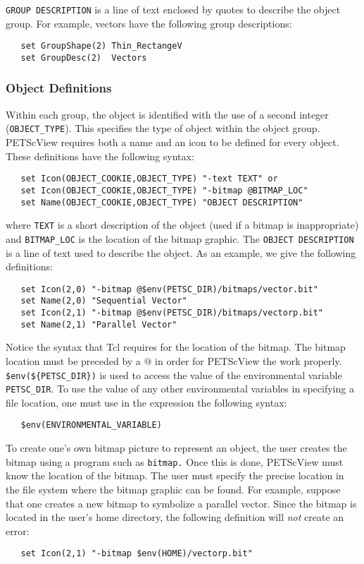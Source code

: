 {{\tt GROUP DESCRIPTION} is a line of text enclosed by quotes to describe the object group.  For example, vectors have the following group descriptions:
\begin{verbatim}
   set GroupShape(2) Thin_RectangeV 
   set GroupDesc(2)  Vectors
\end{verbatim}

\subsubsection{Object Definitions}

Within each group, the object is identified with the use of a second integer ({\tt OBJECT\_TYPE}).  This specifies the type of object within the object group.  PETScView requires both a name and an icon to be defined for every object.  These definitions have the following syntax:
\begin{verbatim}
   set Icon(OBJECT_COOKIE,OBJECT_TYPE) "-text TEXT" or 
   set Icon(OBJECT_COOKIE,OBJECT_TYPE) "-bitmap @BITMAP_LOC"
   set Name(OBJECT_COOKIE,OBJECT_TYPE) "OBJECT DESCRIPTION"
\end{verbatim}
where {\tt TEXT} is a short description of the object (used if a bitmap is inappropriate) and {\tt BITMAP\_LOC} is the location of the bitmap graphic.  The {\tt OBJECT DESCRIPTION} is a line of text used to describe the object.  As an example, we give the following definitions:
\begin{verbatim}
   set Icon(2,0) "-bitmap @$env(PETSC_DIR)/bitmaps/vector.bit" 
   set Name(2,0) "Sequential Vector" 
   set Icon(2,1) "-bitmap @$env(PETSC_DIR)/bitmaps/vectorp.bit" 
   set Name(2,1) "Parallel Vector"
\end{verbatim}
Notice the syntax that Tcl requires for the location of the bitmap.
The bitmap location must be preceded by a $@$ in order for PETScView
the work properly.  {\tt \$env(\$\{PETSC\_DIR\})} is used to access the
value of the environmental variable {\tt PETSC\_DIR}.  To use the
value of any other environmental variables in specifying a file
location, one must use in the expression the following syntax:
\begin{verbatim}
   $env(ENVIRONMENTAL_VARIABLE)
\end{verbatim}

To create one's own bitmap picture to represent an
object, the user creates the bitmap using a program such as {\tt bitmap.}
Once this is done, PETScView must know the location of the
bitmap.  The user must specify the precise location in
the file system where the bitmap graphic can be found.  For example,
suppose that one creates a new bitmap to symbolize a parallel vector.
Since the bitmap is located in the user's home directory, the
following definition will {\em not} create an error:
\begin{verbatim}
   set Icon(2,1) "-bitmap $env(HOME)/vectorp.bit"
\end{verbatim}

}

